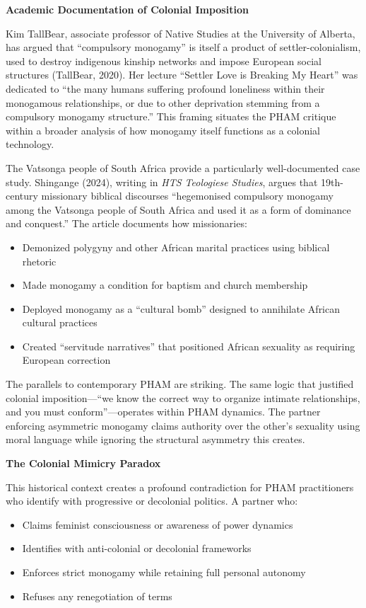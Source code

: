 \documentclass[12pt,openany]{book}
\numberwithin{equation}{chapter}
\begin{document}
\textbf{Academic Documentation of Colonial Imposition}

Kim TallBear, associate professor of Native Studies at the University of Alberta, has argued that ``compulsory monogamy'' is itself a product of settler-colonialism, used to destroy indigenous kinship networks and impose European social structures (TallBear, 2020). Her lecture ``Settler Love is Breaking My Heart'' was dedicated to ``the many humans suffering profound loneliness within their monogamous relationships, or due to other deprivation stemming from a compulsory monogamy structure.'' This framing situates the PHAM critique within a broader analysis of how monogamy itself functions as a colonial technology.

The Vatsonga people of South Africa provide a particularly well-documented case study. Shingange (2024), writing in \textit{HTS Teologiese Studies}, argues that 19th-century missionary biblical discourses ``hegemonised compulsory monogamy among the Vatsonga people of South Africa and used it as a form of dominance and conquest.'' The article documents how missionaries:

\begin{itemize}
    \item Demonized polygyny and other African marital practices using biblical rhetoric
    \item Made monogamy a condition for baptism and church membership
    \item Deployed monogamy as a ``cultural bomb'' designed to annihilate African cultural practices
    \item Created ``servitude narratives'' that positioned African sexuality as requiring European correction
\end{itemize}

The parallels to contemporary PHAM are striking. The same logic that justified colonial imposition---``we know the correct way to organize intimate relationships, and you must conform''---operates within PHAM dynamics. The partner enforcing asymmetric monogamy claims authority over the other's sexuality using moral language while ignoring the structural asymmetry this creates.

\textbf{The Colonial Mimicry Paradox}

This historical context creates a profound contradiction for PHAM practitioners who identify with progressive or decolonial politics. A partner who:

\begin{itemize}
    \item Claims feminist consciousness or awareness of power dynamics
    \item Identifies with anti-colonial or decolonial frameworks
    \item Enforces strict monogamy while retaining full personal autonomy
    \item Refuses any renegotiation of terms
\end{itemize}
\end{document}
